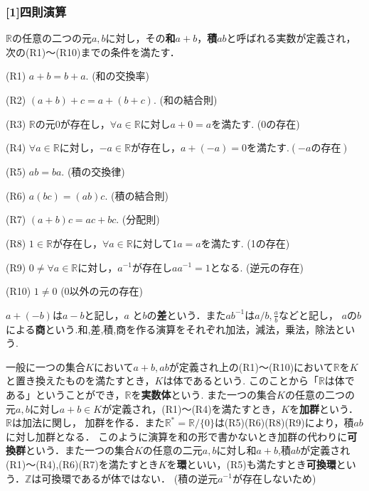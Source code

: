 \documentclass{ltjsarticle}
\theoremstyle{definition}
\theoremstyle{propcorollarystyle}
\theoremstyle{thmcorollarystyle}
\begin{document}
\subsubsection*{[1]四則演算}
$\mathbb{R}$の任意の二つの元$a,b$に対し，その\textbf{和}$a+b$，\textbf{積}$ab$と呼ばれる実数が定義され，次の(R1)～(R10)までの条件を満たす．\par
 (R1) $a+b=b+a$. (和の交換率)\par
 (R2) $(a+b)+c=a+(b+c)$. (和の結合則)\par
 (R3) $\mathbb{R}$の元0が存在し，$\forall a \in \mathbb{R}$に対し$a+0=a$を満たす. (0の存在)\par
 (R4) $\forall a \in \mathbb{R}$に対し，$-a \in \mathbb{R}$が存在し，$a+(-a)=0を満たす. (-aの存在)$\par
 (R5) $ab=ba$. (積の交換律)\par
 (R6) $a(bc)=(ab)c$. (積の結合則)\par
 (R7) $(a+b)c=ac+bc$. (分配則)\par
 (R8) $1 \in \mathbb{R}$が存在し，$\forall a\in \mathbb{R}$に対して$1a=a$を満たす. (1の存在)\par
 (R9) $0\neq \forall a \in \mathbb{R}$に対し，$a^{-1}$が存在し$aa^{-1}=1$となる. (逆元の存在)\par
 (R10) $1\neq0$ (0以外の元の存在)\par
$a+(-b)$は$a-b$と記し，$a$ と$b$の\textbf{差}という．また$ab^{-1}$は$a/b,\frac{a}{b}$などと記し，
$aのb$による\textbf{商}という.和,差,積,商を作る演算をそれぞれ加法，減法，乗法，除法という.\par
一般に一つの集合$K$において$a+b, ab$が定義され上の(R1)～(R10)において$\mathbb{R}$を$K$と置き換えたものを満たすとき，$Kは\textbf{体}$であるという.
このことから「$\mathbb{R}$は体である」ということができ，$\mathbb{R}$を\textbf{実数体}という.
また一つの集合$K$の任意の二つの元$a,b$に対し$a+b\in K$が定義され，(R1)～(R4)を満たすとき，$K$を\textbf{加群}という．$\mathbb{R}$は加法に関し，
加群を作る．また$\mathbb{R}^{*}=\mathbb{R}/\{0\}$は(R5)(R6)(R8)(R9)により，積$ab$に対し加群となる．
このように演算を和の形で書かないとき加群の代わりに\textbf{可換群}という．また一つの集合$K$の任意の二元$a,b$に対し和$a+b$,積$ab$が定義され
(R1)～(R4),(R6)(R7)を満たすとき$K$を\textbf{環}といい，(R5)も満たすとき\textbf{可換環}という．$\mathbb{Z}$は可換環であるが体ではない．
(積の逆元$a^{-1}$が存在しないため)\par
\end{document}
